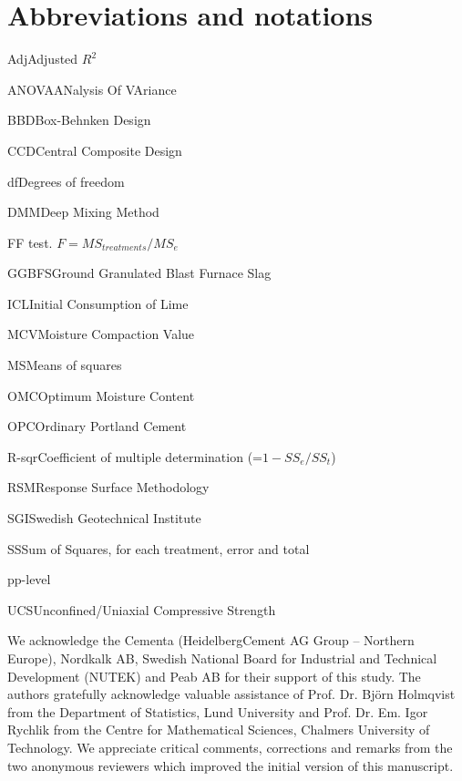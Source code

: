 \documentclass[eprint,
]{actapoly}
\begin{document}
\section{Abbreviations and notations}\label{symb}
\begin{nomenclature}
\item{Adj}{Adjusted $R^2$}
\item{ANOVA}{ANalysis Of VAriance}
\item{BBD}{Box-Behnken Design}
\item{CCD}{Central Composite Design}
\item{df}{Degrees of freedom}
\item{DMM}{Deep Mixing Method}
\item{F}{F test. $F=MS_{treatments}/MS_{e}$}
\item{GGBFS}{Ground Granulated Blast Furnace Slag}
\item{ICL}{Initial Consumption of Lime}
\item{MCV}{Moisture Compaction Value}
\item{MS}{Means of squares}
\item{OMC}{Optimum Moisture Content}
\item{OPC}{Ordinary Portland Cement}
\item{R-sqr}{Coefficient of multiple determination (=$1-SS_{e}/SS_{t}$)}
\item{RSM}{Response Surface Methodology}
\item{SGI}{Swedish Geotechnical Institute}
\item{SS}{Sum of Squares, for each treatment, error and total}
\item{p}{p-level}
\item{UCS}{Unconfined/Uniaxial Compressive Strength}
\end{nomenclature}

\begin{acknowledgements}
We acknowledge the Cementa (HeidelbergCement AG Group -- Northern Europe), Nordkalk AB, Swedish National Board for Industrial and Technical Development (NUTEK) and Peab AB for their support of this study. The authors gratefully acknowledge  valuable assistance of Prof. Dr. Björn Holmqvist from the Department of Statistics, Lund University and Prof. Dr. Em. Igor Rychlik from the Centre for Mathematical Sciences, Chalmers University of Technology. We appreciate critical comments, corrections and remarks from the two anonymous reviewers which improved the initial version of this manuscript.
\end{acknowledgements}




\end{document}
